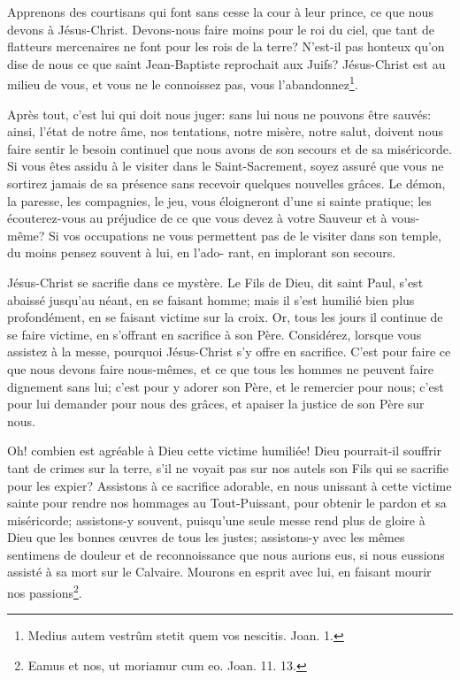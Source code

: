 \documentclass[instructions.tex]{subfiles}
\begin{document}
Apprenons des courtisans qui font sans cesse la cour à leur prince, ce que nous devons à Jésus-Christ. Devons-nous faire moins pour le roi du ciel, que tant de flatteurs mercenaires ne font pour les rois de la terre?  N’est-il pas honteux qu’on dise de nous ce que saint Jean-Baptiste reprochait aux Juifs? Jésus-Christ est au milieu de vous, et vous ne le connoissez pas, vous l’abandonnez\footnote{Medius autem vestrûm stetit quem vos nescitis. Joan. 1.}.

Après tout, c’est lui qui doit nous juger: sans lui nous ne pouvons être sauvés: ainsi, l’état de notre âme, nos tentations, notre misère, notre salut, doivent nous faire sentir le besoin continuel que nous avons de son secours et de sa miséricorde. Si vous êtes assidu à le visiter dans le Saint-Sacrement, soyez assuré que vous ne sortirez jamais de sa présence sans recevoir quelques nouvelles grâces. Le démon, la paresse, les compagnies, le jeu, vous éloigneront d’une si sainte pratique; les écouterez-vous au préjudice de ce que vous devez à votre Sauveur et à vous-même? Si vos occupations ne vous permettent pas de le visiter dans son temple, du moins pensez souvent à lui, en l’ado- rant, en implorant son secours.

\secundo Jésus-Christ se sacrifie dans ce mystère. Le Fils de Dieu, dit saint Paul, s’est abaissé jusqu’au néant, en se faisant homme; mais il s’est humilié bien plus profondément, en se faisant victime sur la croix. Or, tous les jours il continue de se faire victime, en s’offrant en sacrifice à son Père. Considérez, lorsque vous assistez à la messe, pourquoi Jésus-Christ s’y offre en sacrifice. C’est pour faire ce que nous devons faire nous-mêmes, et ce que tous les hommes ne peuvent faire dignement sans lui; c’est pour y adorer son Père, et le remercier pour nous; c’est pour lui demander pour nous des grâces, et apaiser la justice de son Père sur nous.

Oh! combien est agréable à Dieu cette victime humiliée! Dieu pourrait-il souffrir tant de crimes sur la terre, s’il ne voyait pas sur nos autels son Fils qui se sacrifie pour les expier? Assistons à ce sacrifice adorable, en nous unissant à cette victime sainte pour rendre nos hommages au Tout-Puissant, pour obtenir le pardon et sa miséricorde; assistons-y souvent, puisqu’une seule messe rend plus de gloire à Dieu que les bonnes œuvres de tous les justes; assistons-y avec les mêmes sentimens de douleur et de reconnoissance que nous aurions eus, si nous eussions assisté à sa mort sur le Calvaire. Mourons en esprit avec lui, en faisant mourir nos passions\footnote{Eamus et nos, ut moriamur cum eo. Joan. 11. 13.}.
\end{document}
